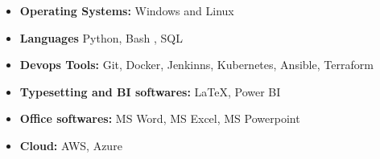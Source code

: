 \documentclass[11pt,a4paper]{moderncv}
\begin{document}
\begin{itemize}
	
	\item \textbf{Operating Systems:} Windows and Linux
	
	\item \textbf{Languages} Python, Bash , SQL%
	\item \textbf{Devops Tools:} Git, Docker, Jenkinns, Kubernetes, Ansible, Terraform
	
	\item \textbf{Typesetting and BI softwares:} \LaTeX, Power BI%
	\item \textbf{Office softwares:} MS Word, MS Excel, MS Powerpoint 
	
	\item \textbf{Cloud:} AWS, Azure
	
	
\end{itemize}
	
%
%	
%	
%	
%	
\end{document}

